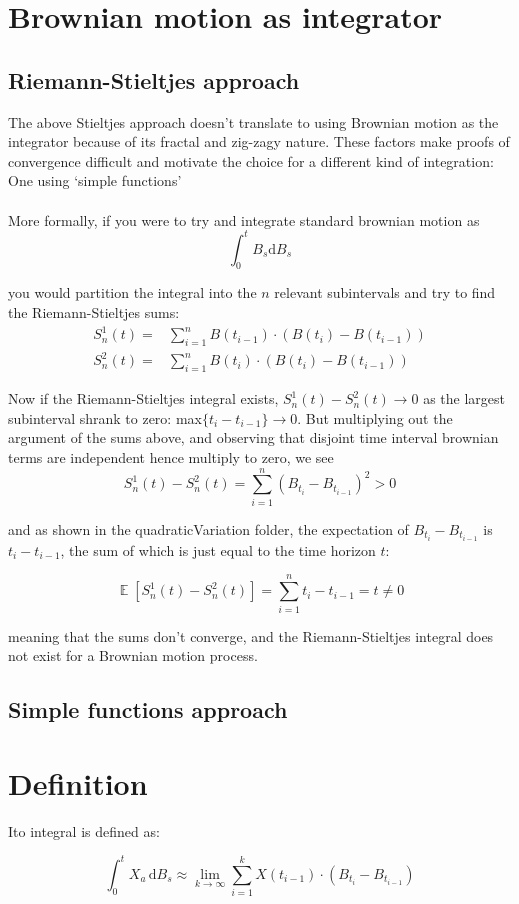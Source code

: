 \documentclass[12pt]{article}
\DeclareMathOperator*{\E}{\mathbb{E}}
\begin{document}
\section{Brownian motion as integrator}

\subsection{Riemann-Stieltjes approach}
The above Stieltjes approach doesn't translate to using Brownian motion as the integrator because of its fractal and zig-zagy nature. These factors make proofs of convergence difficult and motivate the choice for a different kind of integration: One using `simple functions'\\
\\
More formally, if you were to try and integrate standard brownian motion as
\begin{equation}
	\int_{0}^{t}B_s\mathrm{d}B_s
\end{equation}

\noindent you would partition the integral into the $n$ relevant subintervals and try to find the Riemann-Stieltjes sums:
\begin{eqnarray}
	S^1_n(t) =& \sum_{i=1}^{n}B(t_{i-1})\cdot(B(t_i)-B(t_{i-1}))\\
	S^2_n(t) =& \sum_{i=1}^{n}B(t_i)\cdot(B(t_i)-B(t_{i-1}))
\end{eqnarray}

\noindent Now if the Riemann-Stieltjes integral exists, $S^1_n(t)-S^2_n(t)\to 0$ as the largest subinterval shrank to zero: max$\{t_i-t_{i-1}\}\to 0$. But multiplying out the argument of the sums above, and observing that disjoint time interval brownian terms are independent hence multiply to zero, we see
\begin{equation}
	S^1_n(t)-S^2_n(t)=\sum_{i=1}^{n}\left(B_{t_i}-B_{t_{i-1}}\right)^2 > 0
\end{equation}

\noindent and as shown in the quadraticVariation folder, the expectation of $B_{t_i}-B_{t_{i-1}}$ is $t_i-t_{i-1}$, the sum of which is just equal to the time horizon $t$:

\begin{equation}
	\E\left[S^1_n(t)-S^2_n(t)\right]=\sum_{i=1}^{n}t_i-t_{i-1}=t\neq0
\end{equation}

\noindent meaning that the sums don't converge, and the Riemann-Stieltjes integral does not exist for a Brownian motion process.

\subsection{Simple functions approach}



\section{Definition}

Ito integral is defined as:

\begin{equation} \label{eq:itoIntegral}
	\int_{0}^{t}X_a\,\mathrm{d}B_s\approx\lim\limits_{k\to\infty}\sum_{i=1}^{k}X(t_{i-1})\cdot(B_{t_i}-B_{t_{i-1}})
\end{equation}
\end{document}
